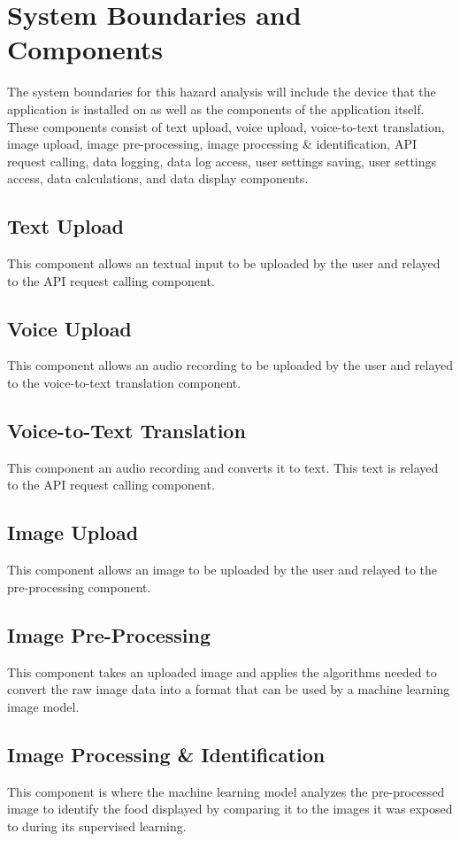 \documentclass{article}
\begin{document}
\section{System Boundaries and Components}
The system boundaries for this hazard analysis will include the device that the application is installed on as well as the components of the application itself. These components consist of text upload, voice upload, voice-to-text translation, image upload, image pre-processing, image processing \& identification, API request calling, data logging, data log access, user settings saving, user settings access, data calculations, and data display components.

\subsection{Text Upload}
This component allows an textual input to be uploaded by the user and relayed to the API request calling component.

\subsection{Voice Upload}
This component allows an audio recording to be uploaded by the user and relayed to the voice-to-text translation component.

\subsection{Voice-to-Text Translation}
This component an audio recording and converts it to text. This text is relayed to the API request calling component.

\subsection{Image Upload}
This component allows an image to be uploaded by the user and relayed to the pre-processing component.

\subsection{Image Pre-Processing}
This component takes an uploaded image and applies the algorithms needed to convert the raw image data into a format that can be used by a machine learning image model.

\subsection{Image Processing \& Identification}
This component is where the machine learning model analyzes the pre-processed image to identify the food displayed by comparing it to the images it was exposed to during its supervised learning. 
\end{document}
